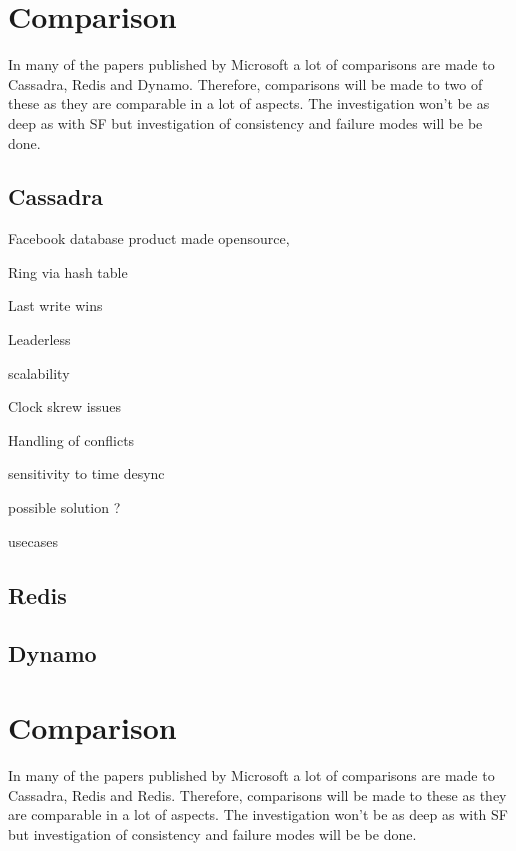 \documentclass[a4paper,10pt,titlepage]{report}
\begin{document}
    \section{Comparison}
    In many of the papers published by Microsoft a lot of comparisons are made to Cassadra, Redis and Dynamo. Therefore, comparisons will be made to two of these as they are comparable in a lot of aspects. The investigation won't be as deep as with SF but investigation of consistency and failure modes will be be done.
    
    
    
    \subsection{Cassadra}
    Facebook database product made opensource,
    
    Ring via hash table
    
    Last write wins
    
    Leaderless
    
    scalability
    
    Clock skrew issues
    
    Handling of conflicts
    
    sensitivity to time desync
    
    possible solution ?
    
    usecases
    
    

    \subsection{Redis}

    \subsection{Dynamo}


    \section{Comparison}
    In many of the papers published by Microsoft a lot of comparisons are made to Cassadra, Redis and Redis. Therefore, comparisons will be made to these as they are comparable in a lot of aspects. The investigation won't be as deep as with SF but investigation of consistency and failure modes will be be done.
\end{document}
